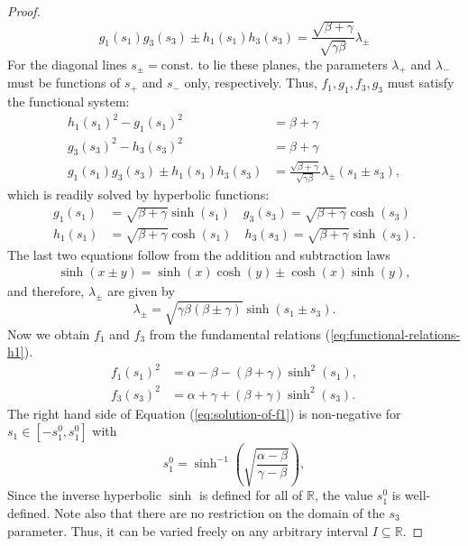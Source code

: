 \documentclass[10pt, a4paper]{article}
\theoremstyle{BoldTopSpacing}
\theoremstyle{BoldTopSpacing}
\theoremstyle{BoldTopSpacing}
\theoremstyle{BoldTopBottomSpacing}
\theoremstyle{BoldTopSpacing}
\theoremstyle{BoldTopBottomSpacing}
\theoremstyle{remark}
\begin{document}
\begin{proof}
\begin{equation}
\label{extra-plane-equation-h1}
    g_1(s_{1}) g_3(s_{3}) \pm h_1(s_{1}) h_3(s_{3}) = \frac{\sqrt{\beta+\gamma}}{\sqrt{\gamma \beta }} \lambda_{\pm}
\end{equation}
For the diagonal lines $s_{\pm} = \text{const.}$ to lie these planes, the parameters $\lambda_{+}$ and $\lambda_{-}$ must be functions of $s_{+}$ and $s_{-}$ only, respectively. Thus, $f_1, g_1, f_3, g_3$ must satisfy the functional system:
\begin{equation*}
\begin{aligned}
h_1(s_{1})^2 - g_1(s_{1})^2 &= \beta  + \gamma \\
g_3(s_{3})^2 - h_3(s_{3})^2 &= \beta  + \gamma \\
g_1(s_{1}) g_3(s_{3}) \pm h_1(s_{1}) h_3(s_{3}) &= \frac{\sqrt{\beta+\gamma}}{\sqrt{\gamma \beta }} \lambda_{\pm}(s_1 \pm s_3),
\end{aligned}
\end{equation*}
which is readily solved by hyperbolic functions:
\begin{equation*}
\begin{aligned}
g_{1}(s_{1}) &= \sqrt{\beta+\gamma} \sinh(s_{1}) \quad g_{3}(s_{3}) = \sqrt{\beta+\gamma} \cosh(s_{3}) \\
h_{1}(s_{1}) &= \sqrt{\beta+\gamma} \cosh(s_{1}) \quad h_{3}(s_{3}) = \sqrt{\beta+\gamma} \sinh(s_{3}).
\end{aligned}
\end{equation*}
The last two equations follow from the addition and subtraction laws
\begin{align*}
\sinh(x \pm y) = \sinh(x) \cosh(y) \pm \cosh(x) \sinh(y),
\end{align*}
and therefore, $\lambda_{\pm}$ are given by
\[
\lambda_{\pm} = \sqrt{ \gamma \beta (\beta \pm \gamma) } \sinh(s_{1} \pm s_{3}).
\]
Now we obtain $f_{1}$ and $f_{3}$ from the fundamental relations (\ref{eq:functional-relations-h1}).
\begin{align}
f_{1}(s_{1})^2 &= \alpha-\beta-(\beta+\gamma)\sinh^2(s_{1}), \label{eq:solution-of-f1} \\
f_{3}(s_{3})^2 &= \alpha+\gamma+(\beta+\gamma)\sinh^2(s_{3}). \label{eq:solution-of-f3}
\end{align}
The right hand side of Equation (\ref{eq:solution-of-f1}) is non-negative for $s_{1} \in [-s_{1}^{0}, s_{1}^{0}]$ with
\[
    s_{1}^{0} = \sinh^{-1}\left( \sqrt{\frac{\alpha - \beta}{\gamma - \beta}} \right),
\]
Since the inverse hyperbolic $\sinh$ is defined for all of $\mathbb{R}$, the value $s_{1}^{0}$ is well-defined. Note also that there are no restriction on the domain of the $s_{3}$ parameter. Thus, it can be varied freely on any arbitrary interval $I \subseteq \mathbb{R}$. \par

\end{proof}
\end{document}
